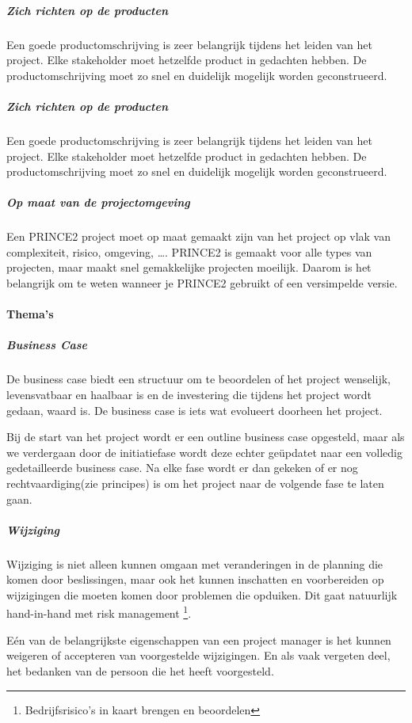 \documentclass[]{article}
\begin{document}
\subparagraph{Zich richten op de producten}
Een goede productomschrijving is zeer belangrijk tijdens het leiden van het project. Elke stakeholder moet hetzelfde product in gedachten hebben. De productomschrijving moet zo snel en duidelijk mogelijk worden geconstrueerd.

\subparagraph{Zich richten op de producten}
Een goede productomschrijving is zeer belangrijk tijdens het leiden van het project. Elke stakeholder moet hetzelfde product in gedachten hebben. De productomschrijving moet zo snel en duidelijk mogelijk worden geconstrueerd.

\subparagraph{Op maat van de projectomgeving}
Een PRINCE2 project moet op maat gemaakt zijn van het project op vlak van complexiteit, risico, omgeving, …. PRINCE2 is gemaakt voor alle types van projecten, maar maakt snel gemakkelijke projecten moeilijk. Daarom is het belangrijk om te weten wanneer je PRINCE2 gebruikt of een versimpelde versie.


\paragraph{Thema's}
\subparagraph{Business Case}
De business case biedt een structuur om te beoordelen of het project wenselijk, levensvatbaar en haalbaar is en de investering die tijdens het project wordt gedaan, waard is. De business case is iets wat evolueert doorheen het project. 

Bij de start van het project wordt er een outline business case opgesteld, maar als we verdergaan door de initiatiefase wordt deze echter geüpdatet naar een volledig gedetailleerde business case. Na elke fase wordt er dan gekeken of er nog rechtvaardiging(zie principes) is om het project naar de volgende fase te laten gaan.

\subparagraph{Wijziging}
Wijziging is niet alleen kunnen omgaan met veranderingen in de planning die komen door beslissingen, maar ook het kunnen inschatten en voorbereiden op wijzigingen die moeten komen door problemen die opduiken. Dit gaat natuurlijk hand-in-hand met risk management \footnote{Bedrijfsrisico's in kaart brengen en beoordelen}.

Eén van de belangrijkste eigenschappen van een project manager is het kunnen weigeren of accepteren van voorgestelde wijzigingen. En als vaak vergeten deel, het bedanken van de persoon die het heeft voorgesteld.
\end{document}
